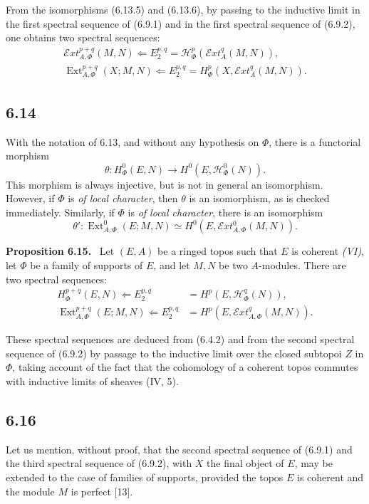 \documentclass[11pt]{article}
\newcommand{\Hh}{\mathcal{H}}
\newcommand{\Ext}{\operatorname{Ext}}
\newcommand{\Eext}{\mathcal{E}xt}
\newenvironment{statement}[1]{\par\medskip\noindent\textbf{#1.}\ }{\par\medskip}
\begin{document}
From the isomorphisms (6.13.5) and (6.13.6), by passing to the inductive limit in the first spectral sequence of (6.9.1) and in the first spectral sequence of (6.9.2), one obtains two spectral sequences:
\begin{gather*}
        \Eext_{A,\Phi}^{p+q}(M,N)\Longleftarrow E_2^{p,q}=\Hh_\Phi^p(\Eext_A^q(M,N)),\tag{6.13.9}\\
        \Ext_{A,\Phi}^{p+q}(X;M,N)\Longleftarrow E_2^{p,q}=H_\Phi^p(X,\Eext_A^q(M,N)).\tag{6.13.10}
\end{gather*}

\subsection*{6.14}
With the notation of 6.13, and without any hypothesis on $\Phi$, there is a functorial morphism
\begin{equation*}
        \theta:H_\Phi^0(E,N)\to H^0(E,\Hh_\Phi^0(N)).\tag{6.14.1}
\end{equation*}
This morphism is always injective, but is not in general an isomorphism. However, if $\Phi$ is \emph{of local character}, then $\theta$ is an isomorphism, as is checked immediately. Similarly, if $\Phi$ is \emph{of local character}, there is an isomorphism
\begin{equation*}
        \theta':\Ext_{A,\Phi}^0(E;M,N)\simeq H^0(E,\Eext_{A,\Phi}^0(M,N)).\tag{6.14.2}
\end{equation*}

\begin{statement}{Proposition 6.15}
Let $(E,A)$ be a ringed topos such that $E$ is coherent \emph{(VI)}, let $\Phi$ be a family of supports of $E$, and let $M,N$ be two $A$-modules. There are two spectral sequences:
\begin{align*}
        H_\Phi^{p+q}(E,N)\Longleftarrow E_2^{p,q}&=H^p(E,\Hh_\Phi^q(N)),\tag{6.15.1}\\
        \Ext_{A,\Phi}^{p+q}(E;M,N)\Longleftarrow E_2^{p,q}&=H^p(E,\Eext_{A,\Phi}^q(M,N)).\tag{6.15.2}
\end{align*}
\end{statement}

These spectral sequences are deduced from (6.4.2) and from the second spectral sequence of (6.9.2) by passage to the inductive limit over the closed subtopoi $Z$ in $\Phi$, taking account of the fact that the cohomology of a coherent topos commutes with inductive limits of sheaves (IV, 5).

\subsection*{6.16}
Let us mention, without proof, that the second spectral sequence of (6.9.1) and the third spectral sequence of (6.9.2), with $X$ the final object of $E$, may be extended to the case of families of supports, provided the topos $E$ is coherent and the module $M$ is perfect [13].
\end{document}
